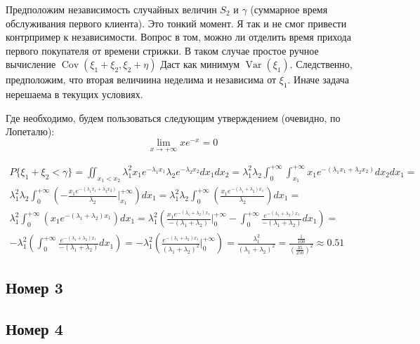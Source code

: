 \documentclass[a4paper,12pt]{article}
\DeclareMathOperator{\Var}{Var}
\DeclareMathOperator{\Cov}{Cov}
\begin{document}
Предположим независимость случайных величин $ S_2 $ и $ \gamma $ (суммарное время обслуживания первого клиента). Это тонкий момент. Я так и не смог привести контрпример к независимости. Вопрос в том, можно ли отделить время прихода первого покупателя от времени стрижки. В таком случае простое ручное вычисление $ \Cov(\xi_1 + \xi_2, \xi_2 + \eta) $ Даст как минимум $ \Var(\xi_1) $. Следственно, предположим, что вторая величиина неделима и независима от $ \xi_1 $. Иначе задача нерешаема в текущих условиях.

Где необходимо, будем пользоваться следующим утверждением (очевидно, по Лопеталю):
\[ \lim\limits_{x \to +\infty} x e^{-x} = 0 \]


\begin{equation}
\begin{aligned}
P\{ \xi_1 + \xi_2 < \gamma \} = \iint_{x_1 < x_2} \lambda_1^2 x_1 e^{-\lambda_1x_1} \lambda_2 e^{-\lambda_2x_2 } dx_1 dx_2 = 
\lambda_1^2\lambda_2 \int_{0}^{+ \infty} \int_{x_1}^{+ \infty} x_1 e^{-(\lambda_1x_1 + \lambda_2 x_2 )} dx_2 dx_1 = \\
\lambda_1^2\lambda_2 \int_{0}^{+ \infty} \left( -\frac{x_1 e^{-(\lambda_1x_1 + \lambda_2 x_2 )}}{\lambda_2} \bigg|^{+ \infty}_{x_1} \right) dx_1= \lambda_1^2\lambda_2 \int_{0}^{+ \infty} \left( \frac{x_1 e^{-(\lambda_1 + \lambda_2) x_1}}{\lambda_2} \right) dx_1 = \\ \lambda_1^2 \int_{0}^{+ \infty} \left( x_1 e^{-(\lambda_1 + \lambda_2) x_1} \right) dx_1 = \lambda_1^2 \left( \frac{x_1 e^{-(\lambda_1 + \lambda_2) x_1}}{-(\lambda_1 + \lambda_2)} \bigg |^{+\infty}_0 - \int_{0}^{+ \infty} \frac{ e^{-(\lambda_1 + \lambda_2) x_1}}{-(\lambda_1 + \lambda_2)} dx_1 \right) = \\ - \lambda_1^2 \left( \int_{0}^{+ \infty} \frac{ e^{-(\lambda_1 + \lambda_2) x_1}}{-(\lambda_1 + \lambda_2)} dx_1 \right)
= -\lambda_1^2 \left(  \frac{ e^{-(\lambda_1 + \lambda_2) x_1}}{(\lambda_1 + \lambda_2)^2}\bigg |^{+\infty}_0 \right) =
\frac{\lambda_1^2}{(\lambda_1 + \lambda_2)^2} = \frac{\frac{1}{100}}{(\frac{35}{250})^2} \approx 0.51
\end{aligned}
\end{equation}


\subsection{Номер 3}

\subsection{Номер 4}
\end{document}

